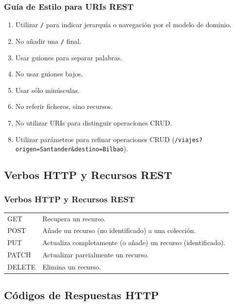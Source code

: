 \documentclass[handout,a4paper,slidestop,xcolor=pst,blue]{beamer}
\begin{document}
\begin{frame}[c]
    \frametitle{Guía de Estilo para URIs REST}
    \begin{enumerate}[<+->]
        \item Utilizar \texttt{/} para indicar jerarquía o navegación por el modelo de dominio.
        \item No añadir una \texttt{/} final.
        \item Usar guiones \texttt{\-} para separar palabras.
        \item No usar guiones bajos.
        \item Usar sólo minúsculas.
        \item No referir ficheros, sino recursos.
        \item No utilizar URIs para distinguir operaciones CRUD.
        \item Utilizar parámetros para refinar operaciones CRUD (\texttt{/viajes?origen=Santander\&destino=Bilbao}).
    \end{enumerate}
\end{frame}

\subsection{Verbos HTTP y Recursos REST}

\begin{frame}[c]
    \frametitle{Verbos HTTP y Recursos REST}
    \begin{tabular}{ll} \hline
        GET    & Recupera un recurso. \\
        POST   & Añade un recurso (no identificado) a una colección. \\
        PUT    & Actualiza completamente (o añade) un recurso (identificado). \\
        PATCH  & Actualizar parcialmente un recurso. \\
        DELETE & Elimina un recurso. \\ \hline
    \end{tabular}
\end{frame}

\subsection{Códigos de Respuestas HTTP}
\end{document}
